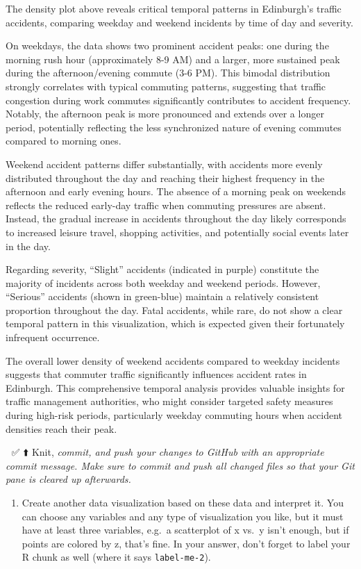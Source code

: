 \documentclass[
]{article}
\providecommand{\tightlist}{%
  \setlength{\itemsep}{0pt}\setlength{\parskip}{0pt}}
\begin{document}
The density plot above reveals critical temporal patterns in Edinburgh's
traffic accidents, comparing weekday and weekend incidents by time of
day and severity.

On weekdays, the data shows two prominent accident peaks: one during the
morning rush hour (approximately 8-9 AM) and a larger, more sustained
peak during the afternoon/evening commute (3-6 PM). This bimodal
distribution strongly correlates with typical commuting patterns,
suggesting that traffic congestion during work commutes significantly
contributes to accident frequency. Notably, the afternoon peak is more
pronounced and extends over a longer period, potentially reflecting the
less synchronized nature of evening commutes compared to morning ones.

Weekend accident patterns differ substantially, with accidents more
evenly distributed throughout the day and reaching their highest
frequency in the afternoon and early evening hours. The absence of a
morning peak on weekends reflects the reduced early-day traffic when
commuting pressures are absent. Instead, the gradual increase in
accidents throughout the day likely corresponds to increased leisure
travel, shopping activities, and potentially social events later in the
day.

Regarding severity, ``Slight'' accidents (indicated in purple)
constitute the majority of incidents across both weekday and weekend
periods. However, ``Serious'' accidents (shown in green-blue) maintain a
relatively consistent proportion throughout the day. Fatal accidents,
while rare, do not show a clear temporal pattern in this visualization,
which is expected given their fortunately infrequent occurrence.

The overall lower density of weekend accidents compared to weekday
incidents suggests that commuter traffic significantly influences
accident rates in Edinburgh. This comprehensive temporal analysis
provides valuable insights for traffic management authorities, who might
consider targeted safety measures during high-risk periods, particularly
weekday commuting hours when accident densities reach their peak.

🧶 ✅ ⬆️ Knit, \emph{commit, and push your changes to GitHub with an
appropriate commit message. Make sure to commit and push all changed
files so that your Git pane is cleared up afterwards.}

\begin{enumerate}
\def\labelenumi{\arabic{enumi}.}
\setcounter{enumi}{3}
\tightlist
\item
  Create another data visualization based on these data and interpret
  it. You can choose any variables and any type of visualization you
  like, but it must have at least three variables, e.g.~a scatterplot of
  x vs.~y isn't enough, but if points are colored by z, that's fine. In
  your answer, don't forget to label your R chunk as well (where it says
  \texttt{label-me-2}).
\end{enumerate}
\end{document}
